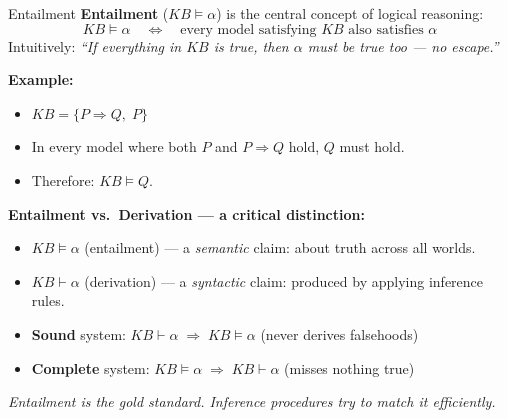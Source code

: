 \documentclass[10pt]{beamer}
\begin{document}
\begin{frame}{Entailment}
    \small
    \textbf{Entailment} ($KB \models \alpha$) is the central concept of logical reasoning:
    \[
        KB \models \alpha \quad \iff \quad \text{every model satisfying } KB \text{ also satisfies } \alpha
    \]
    Intuitively: \emph{``If everything in $KB$ is true, then $\alpha$ must be true too — no escape.''}

    \vspace{0.08cm}
    \textbf{Example:}
    \begin{itemize}\setlength{\itemsep}{1pt}
        \item $KB = \{ P \Rightarrow Q,\; P \}$
        \item In every model where both $P$ and $P \Rightarrow Q$ hold, $Q$ must hold.
        \item Therefore: $KB \models Q$.
    \end{itemize}

    \vspace{0.08cm}
    \textbf{Entailment vs.\ Derivation — a critical distinction:}
    \begin{itemize}\setlength{\itemsep}{2pt}
        \item $KB \models \alpha$ \;(entailment) — a \emph{semantic} claim: about truth across all worlds.
        \item $KB \vdash \alpha$ \;(derivation) — a \emph{syntactic} claim: produced by applying inference rules.
        \item \textbf{Sound} system: $KB \vdash \alpha \;\Rightarrow\; KB \models \alpha$ \quad (never derives falsehoods)
        \item \textbf{Complete} system: $KB \models \alpha \;\Rightarrow\; KB \vdash \alpha$ \quad (misses nothing true)
    \end{itemize}

    \vspace{0.06cm}
    \textit{Entailment is the gold standard. Inference procedures try to match it efficiently.}
\end{frame}
\end{document}
